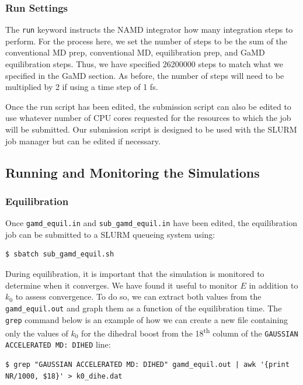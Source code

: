 \documentclass[9pt,tutorial]{livecoms}
\begin{document}
\subsubsection{Run Settings}
The \texttt{run} keyword instructs the NAMD integrator how many integration steps to perform. For the process here, we set the number of steps to be the sum of the conventional MD prep, conventional MD, equilibration prep, and GaMD equilibration steps. Thus, we have specified 26200000 steps to match what we specified in the GaMD section. As before, the number of steps will need to be multiplied by 2 if using a time step of 1 fs. 

Once the run script has been edited, the submission script can also be edited to use whatever number of CPU cores requested for the resources to which the job will be submitted. Our submission script is designed to be used with the SLURM job manager but can be edited if necessary.

\subsection{Running and Monitoring the Simulations}
\subsubsection{Equilibration} \label{ss:tutorial_equil}
Once \texttt{gamd\_equil.in} and \texttt{sub\_gamd\_equil.in} have been edited, the equilibration job can be submitted to a SLURM queueing system using:

\begin{lstlisting}[style=MyBash]
$ sbatch sub_gamd_equil.sh
\end{lstlisting}

During equilibration, it is important that the simulation is monitored to determine when it converges. We have found it useful to monitor $E$ in addition to $k_{0}$ to assess convergence. To do so, we can extract both values from the \texttt{gamd\_equil.out} and graph them as a function of the equilibration time. The \texttt{grep} command below is an example of how we can create a new file containing only the values of $k_{0}$ for the dihedral boost from the 18\textsuperscript{th} column of the \texttt{GAUSSIAN ACCELERATED MD: DIHED} line: 

\begin{lstlisting}[style=MyBash]
$ grep "GAUSSIAN ACCELERATED MD: DIHED" gamd_equil.out | awk '{print NR/1000, $18}' > k0_dihe.dat
\end{lstlisting}
\end{document}
